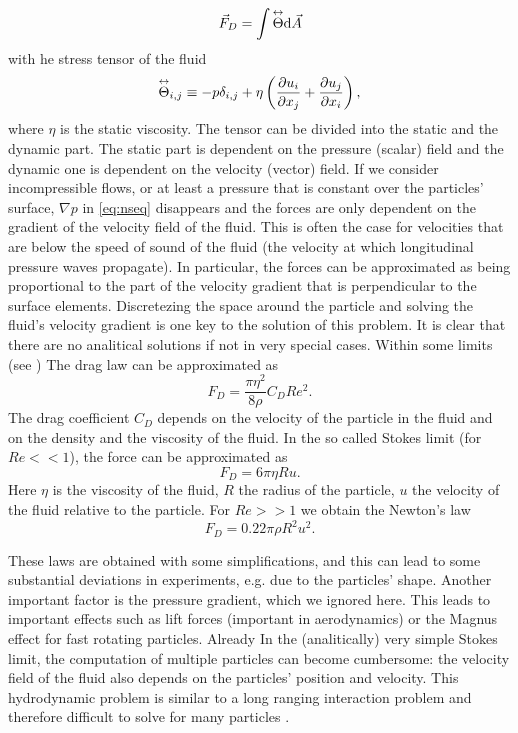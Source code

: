 \begin{equation}
\vec{F}_D = \int \overset{\leftrightarrow}{\Theta} \text{d} \vec{A}
\end{equation}
with he stress tensor of the fluid
\begin{equation}
\overset{\leftrightarrow}{\Theta}_{i,j} \equiv - p \delta_{i,j} + \eta\left(\frac{\partial u_i}{\partial x_j} + \frac{\partial u_j}{\partial x_i}\right),
\end{equation}
where $\eta$ is the static viscosity. The tensor can be divided into the static and the dynamic part. The static part is dependent on the pressure (scalar) field and the dynamic one is dependent on the velocity (vector) field. If we consider incompressible flows, or at least a pressure that is constant over the particles' surface, $\nabla p$ in \eqref{eq:nseq} disappears and the forces are only dependent on the gradient of the velocity field of the fluid. This is often the case for velocities that are below the speed of sound of the fluid (the velocity at which longitudinal pressure waves propagate). In particular, the forces can be approximated as being proportional to the part of the velocity gradient that is perpendicular  to the surface elements. Discretezing the space around the particle and solving the fluid's velocity gradient is one key to the solution of this problem. It is clear that there are no analitical solutions if not in very special cases. Within some limits (see \cite{drag_law}) The drag law can be approximated as
\begin{equation}
F_D = \frac{\pi\eta^2}{8\rho} C_D Re^2.
\end{equation}
The drag coefficient $C_D$ depends on the velocity of the particle in the fluid and on the density and the viscosity of the fluid. In the so called Stokes limit (for $Re << 1$), the force can be approximated as
\begin{equation}
F_D = 6\pi \eta R u.
\end{equation}
Here $\eta$ is the viscosity of the fluid, $R$ the radius of the particle, $u$ the  velocity of the fluid relative to the particle. For $Re >> 1$ we obtain the Newton's law
\begin{equation}
F_D = 0.22 \pi \rho R^2 u^2.
\end{equation}

These laws are obtained with some simplifications, and this can lead to some substantial deviations in experiments, e.g. due to the particles' shape. Another important factor is the pressure gradient, which we ignored here. This leads to important effects such as lift forces (important in aerodynamics) or the Magnus effect for fast rotating particles. Already In the (analitically) very simple Stokes limit, the computation of multiple particles can become cumbersome: the velocity field of the fluid also depends on the particles' position and velocity. This hydrodynamic problem is similar to a long ranging interaction problem and therefore difficult to solve for many particles \citep{hydropaper}.






